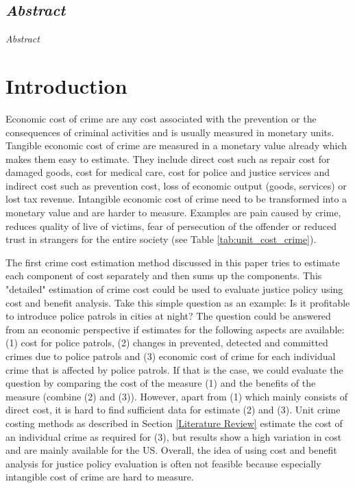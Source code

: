 \documentclass[a4paper,12pt]{article}
\begin{document}
% 





\setcounter{page}{1}        %


\subsection*{\textit{Abstract}}

\textit{Abstract}


\section{Introduction}
\label{Introduction}
Economic cost of crime are any cost associated with the prevention or the consequences of criminal activities and is usually measured in monetary units.
Tangible economic cost of crime are measured in a monetary value already which makes them easy to estimate. They include direct cost such as repair cost for damaged goods, cost for medical care, cost for police and justice services and indirect cost such as prevention cost, loss of economic output (goods, services) or lost tax revenue.
Intangible economic cost of crime  need to be transformed into a monetary value and are harder to measure. Examples are pain caused by crime, reduces quality of live of victims, fear of persecution of the offender or reduced trust in strangers for the entire society (see Table \ref{tab:unit_cost_crime}).  \citep{kosten_nutzen_entorf} 

The first crime cost estimation method discussed in this paper tries to estimate each component of cost separately and then sums up the components.
This "detailed" estimation of crime cost could be used to evaluate justice policy using cost and benefit analysis. Take this simple question as an example: Is it profitable to introduce police patrols in cities at night? The question could be answered from an economic perspective if estimates for the following aspects are available: (1) cost for police patrols, (2) changes in prevented, detected and committed crimes due to police patrols and (3) economic cost of crime for each individual crime that is affected by police patrols. If that is the case, we could evaluate the question by comparing the cost of the measure (1) and the benefits of the measure (combine (2) and (3)).
However, apart from (1) which mainly consists of direct cost, it is hard to find sufficient data for estimate (2) and (3). Unit crime costing methods as described in Section \ref{Literature Review} estimate the cost of an individual crime as required for (3), but results show a high variation in cost and are mainly available for the US. 
Overall, the idea of using cost and benefit analysis for justice policy evaluation is often not feasible because especially intangible cost of crime are hard to measure.
\end{document}
